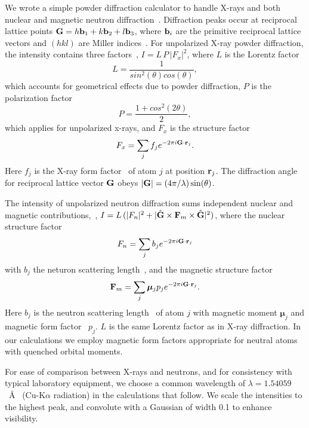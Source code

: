 \documentclass[twoside,12pt]{article}
\def\bF{{\bf F}}
\def\bG{{\bf G}}
\def\bGh{{\hat{\bf G}}}
\def\bb{{\bf b}}
\def\br{{\bf r}}
\begin{document}
We wrote a simple powder diffraction calculator to handle X-rays and both nuclear and magnetic neutron diffraction~\cite{github}. Diffraction peaks occur at reciprocal lattice points $\bG=h\bb_1 + k\bb_2 + l\bb_3$, where $\bb_i$ are the primitive reciprocal lattice vectors and $(hkl)$ are Miller indices~\cite{Kittel}. For unpolarized X-ray powder diffraction, the intensity contains three factors~\cite{cullity,vesta}, $I=L\, P\, |F_x|^2$, where $L$ is the Lorentz factor
\begin{equation}
    L = \frac{1}{sin^2(\theta)cos(\theta)},
  \end{equation}
 which accounts for geometrical effects due to powder diffraction, $P$ is the polarization factor
\begin{equation}
    P = \frac{1+cos^2(2\theta)}{2},
\end{equation}
which applies for unpolarized x-rays, and $F_x$ is the structure factor
\begin{equation}
  \label{eq:X-ray}
F_x=\sum_{j} f_je^{-2\pi i \bG\cdot\br_j}.
\end{equation}
Here $f_j$ is the X-ray form factor~\cite{xray_form_factors} of atom $j$ at position $\br_j$. The diffraction angle for reciprocal lattice vector $\bG$ obeys $|\bG|=(4\pi/\lambda)\sin(\theta)$.

The intensity of unpolarized neutron diffraction sums independent nuclear and magnetic contributions,~\cite{rossat-mignod,squires,gsas}, $I = L\, (|F_n|^2+|\bGh\times\bF_m\times\bGh|^2)$, where the nuclear structure factor
\begin{equation}
    F_n = \sum_{j} b_j e^{-2\pi i \bG\cdot\br_j}
\end{equation}
with $b_j$ the neturon scattering length~\cite{neutron_scattering_lengths}, and the magnetic structure factor
\begin{equation}
  \bF_m = \sum_{j} \boldsymbol{\mu}_j p_j e^{-2\pi i \bG\cdot\br_j}.
\end{equation}
Here $b_j$ is the neutron scattering length~\cite{neutron_scattering_lengths} of atom $j$ with magnetic moment $\boldsymbol{\mu}_j$ and magnetic form factor~\cite{magnetic_form_factors} $p_j$. $L$ is the same Lorentz factor as in X-ray diffraction. In our calculations we employ magnetic form factors appropriate for neutral atoms with quenched orbital moments.

For ease of comparison between X-rays and neutrons, and for consistency with typical laboratory equipment, we choose a common wavelength of $\lambda = 1.54059$~\AA~ (Cu-K$\alpha$ radiation) in the calculations that follow. We scale the intensities to the highest peak, and convolute with a Gaussian of width 0.1 to enhance visibility.
\end{document}
